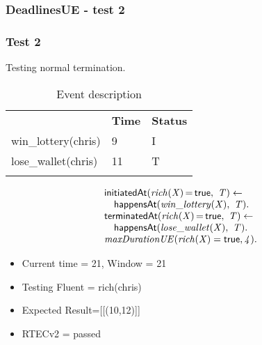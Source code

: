 \documentclass[8pt]{beamer}
\DeclareMathOperator{\val}{=}  %
\def \patsize {}
\def\happensAt{\textsf{\patsize happensAt}}
\def\initiatedAt{\textsf{\patsize initiatedAt}}
\def\terminatedAt{\textsf{\patsize terminatedAt}}
\def\true{\textsf{\patsize true}}
\newenvironment{mysplit}%
  {\arraycolsep 0pt \begin{array}{l}}%
  {\end{array}}
\begin{document}
\begin{frame}
    \frametitle{DeadlinesUE - test 2}
    \subsubsection{Test 2}
    \small
    Testing normal termination.\linebreak
    \begin{minipage}{0.48\linewidth}
        \begin{table}[t!]
            \caption{Event description}
            \begin{center}

                \begin{tabular}{lll}
                    \hline\noalign{\smallskip}
                    \multicolumn{1}{l}{\textbf{Event}} & \multicolumn{1}{c}{\textbf{Time}} & \multicolumn{1}{c}{\textbf{Status}} \\
                    win\_lottery(chris)& 9 & I\\
                    lose\_wallet(chris)& 11 & T\\
                    \noalign{\smallskip}
                    \hline
                \end{tabular}
            \end{center}
        \end{table}
    \end{minipage}
    \begin{minipage}{0.48\linewidth}
        \begin{align*}
            \begin{mysplit}
                \initiatedAt\mathit{(rich(X)\val\true,\ T) \leftarrow}\\
                \quad    \happensAt\mathit{(win\_lottery(X),\ T).}\\
                \terminatedAt\mathit{(rich(X)\val\true,\ T) \leftarrow}\\
                \quad    \happensAt\mathit{(lose\_wallet(X),\ T)}.\\
                \mathit{maxDurationUE(rich(X)=\true,4).}\\
            \end{mysplit}
        \end{align*}
    \end{minipage}
    \begin{itemize}
        \item Current time = 21, Window = 21
        \item Testing Fluent = rich(chris)
        \item Expected Result=[[(10,12)]]
        \item RTECv2 = passed
    \end{itemize}
\end{frame}
\end{document}
